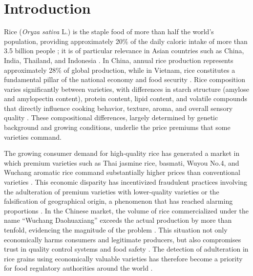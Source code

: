 \documentclass[final,5p,times,twocolumn]{elsarticle}
\begin{document}
\section{Introduction}\label{sec1}

Rice (\textit{Oryza sativa} L.) is the staple food of more than half the world's population, providing approximately 20\% of the daily caloric intake of more than 3.5 billion people \citep{subbuthavamurugan2023}; it is of particular relevance in Asian countries such as China, India, Thailand, and Indonesia \citep{Muthayya2014}. 
In China, annual rice production represents approximately 28\% of global production, while in Vietnam, rice constitutes a fundamental pillar of the national economy and food security \citep{Giang2020b, Tong2021}. 
Rice composition varies significantly between varieties, with differences in starch structure (amylose and amylopectin content), protein content, lipid content, and volatile compounds that directly influence cooking behavior, texture, aroma, and overall sensory quality \citep{Sampaio2019,Xie2024}. 
These compositional differences, largely determined by genetic background and growing conditions, underlie the price premiums that some varieties command.

The growing consumer demand for high-quality rice has generated a market in which premium varieties such as Thai jasmine rice, basmati, Wuyou No.4, and Wuchang aromatic rice command substantially higher prices than conventional varieties \citep{Teye2022, Tong2021, Sun2025, Zaresani2024}. 
This economic disparity has incentivized fraudulent practices involving the adulteration of premium varieties with lower-quality varieties or the falsification of geographical origin, a phenomenon that has reached alarming proportions \citep{Teye2022, SliwinskaBartel2021}. 
In the Chinese market, the volume of rice commercialized under the name ``Wuchang Daohuaxiang'' exceeds the actual production by more than tenfold, evidencing the magnitude of the problem \citep{Sun2025, Li2025}. 
This situation not only economically harms consumers and legitimate producers, but also compromises trust in quality control systems and food safety \citep{Shi2025, Rahmani2022, SliwinskaBartel2021}. 
The detection of adulteration in rice grains using economically valuable varieties has therefore become a priority for food regulatory authorities around the world \citep{Teye2022, Edris2024}.
\end{document}
